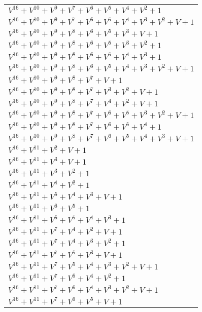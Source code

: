 \documentclass[12pt]{article}
\begin{document}
\begin{adjustwidth}{-4cm}{}
\begin{center}
\begin{longtable}{|l|}
$V^{16}  +V^{10}  +V^{9}  +V^{7}  +V^{6}  +V^{5}  +V^{4}  +V^{2}  + 1$ \\
$V^{16}  +V^{10}  +V^{9}  +V^{7}  +V^{6}  +V^{5}  +V^{4}  +V^{3}  +V^{2}  + V + 1$ \\
$V^{16}  +V^{10}  +V^{9}  +V^{8}  +V^{6}  +V^{5}  +V^{3}  + V + 1$ \\
$V^{16}  +V^{10}  +V^{9}  +V^{8}  +V^{6}  +V^{5}  +V^{3}  +V^{2}  + 1$ \\
$V^{16}  +V^{10}  +V^{9}  +V^{8}  +V^{6}  +V^{5}  +V^{4}  +V^{3}  + 1$ \\
$V^{16}  +V^{10}  +V^{9}  +V^{8}  +V^{6}  +V^{5}  +V^{4}  +V^{3}  +V^{2}  + V + 1$ \\
$V^{16}  +V^{10}  +V^{9}  +V^{8}  +V^{7}  + V + 1$ \\
$V^{16}  +V^{10}  +V^{9}  +V^{8}  +V^{7}  +V^{3}  +V^{2}  + V + 1$ \\
$V^{16}  +V^{10}  +V^{9}  +V^{8}  +V^{7}  +V^{4}  +V^{2}  + V + 1$ \\
$V^{16}  +V^{10}  +V^{9}  +V^{8}  +V^{7}  +V^{6}  +V^{5}  +V^{3}  +V^{2}  + V + 1$ \\
$V^{16}  +V^{10}  +V^{9}  +V^{8}  +V^{7}  +V^{6}  +V^{5}  +V^{4}  + 1$ \\
$V^{16}  +V^{10}  +V^{9}  +V^{8}  +V^{7}  +V^{6}  +V^{5}  +V^{4}  +V^{3}  + V + 1$ \\
$V^{16}  +V^{11}  +V^{2}  + V + 1$ \\
$V^{16}  +V^{11}  +V^{3}  + V + 1$ \\
$V^{16}  +V^{11}  +V^{3}  +V^{2}  + 1$ \\
$V^{16}  +V^{11}  +V^{4}  +V^{2}  + 1$ \\
$V^{16}  +V^{11}  +V^{5}  +V^{4}  +V^{3}  + V + 1$ \\
$V^{16}  +V^{11}  +V^{6}  +V^{5}  + 1$ \\
$V^{16}  +V^{11}  +V^{6}  +V^{5}  +V^{4}  +V^{3}  + 1$ \\
$V^{16}  +V^{11}  +V^{7}  +V^{4}  +V^{2}  + V + 1$ \\
$V^{16}  +V^{11}  +V^{7}  +V^{4}  +V^{3}  +V^{2}  + 1$ \\
$V^{16}  +V^{11}  +V^{7}  +V^{5}  +V^{3}  + V + 1$ \\
$V^{16}  +V^{11}  +V^{7}  +V^{5}  +V^{4}  +V^{3}  +V^{2}  + V + 1$ \\
$V^{16}  +V^{11}  +V^{7}  +V^{6}  +V^{4}  +V^{2}  + 1$ \\
$V^{16}  +V^{11}  +V^{7}  +V^{6}  +V^{4}  +V^{3}  +V^{2}  + V + 1$ \\
$V^{16}  +V^{11}  +V^{7}  +V^{6}  +V^{5}  + V + 1$ \\

\end{longtable}
\end{center}
\end{adjustwidth}
\end{document}
